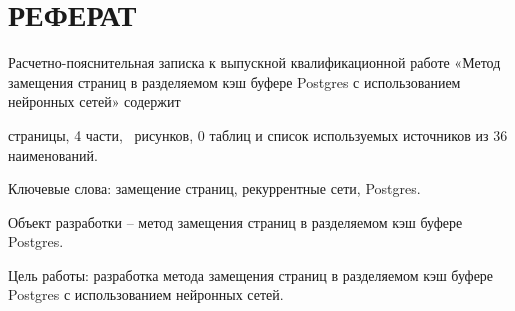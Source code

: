 \setcounter{page}{5}

\chapter*{РЕФЕРАТ}







Расчетно-пояснительная записка к выпускной квалификационной работе «Метод замещения страниц в разделяемом кэш буфере Postgres с использованием нейронных сетей» содержит \begin{NoHyper}\pageref{LastPage}\end{NoHyper} страницы, 4 части, \totfig~рисунков, 0 таблиц и список используемых источников из 36 наименований.

Ключевые слова: замещение страниц, рекуррентные сети, Postgres.
	
Объект разработки -- метод замещения страниц в разделяемом кэш буфере Postgres.

Цель работы: разработка метода замещения страниц в разделяемом кэш буфере Postgres с использованием нейронных сетей. 

